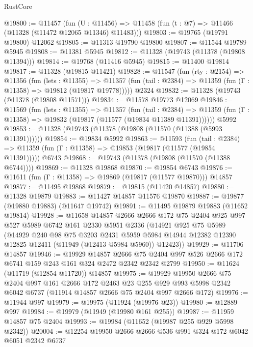 \begin{lexlean}{RustCore}
\begin{coremodule}
@19800 := @11457
    (fun (U : @11456) => @11458 (fun (t : @7) => @11466 (@11328 (@11472 @12065 @11346) @11483)))
@19803 := @19765 (@19791 @19800) @12062
@19805 := @11313 @19790 @19800
@19807 := @11544 @19789 @5945
@19808 := @11381 @5945
@19812 := @11328 (@19743 (@11378 (@19808 @11394)))
@19814 := @19768 (@11416 @5945)
@19815 := @11400 @19814
@19817 := @11328 (@19815 @11421)
@19828 := @11547
    (fun (rty : @2154) =>
    @11356
      (fun (lets : @11355) =>
      @11357 (fun (tail : @2384) => @11359 (fun (Γ : @11358) => @19812 (@19817 @19778)))))
    @2324
@19832 := @11328 (@19743 (@11378 (@19808 @11571)))
@19834 := @11578 @19773 @12069
@19846 := @11569
    (fun (lets : @11355) =>
    @11357
      (fun (tail : @2384) =>
      @11359 (fun (Γ : @11358) => @19832 (@19817 (@11577 (@19834 @11389 @11391))))))
    @5992
@19853 := @11328 (@19743 (@11378 (@19808 (@11570 (@11388 (@5993 @11391))))))
@19854 := @19834 @5992
@19863 := @11593
    (fun (tail : @2384) => @11359 (fun (Γ : @11358) => @19853 (@19817 (@11577 (@19854 @11391)))))
    @6743
@19868 := @19743 (@11378 (@19808 (@11570 (@11388 @6744))))
@19869 := @11328 @19868
@19870 := @19854 @6743
@19876 := @11611 (fun (Γ : @11358) => @19869 (@19817 (@11577 @19870))) @14857
@19877 := @11495 @19868
@19879 := @19815 (@11420 @14857)
@19880 := @11328 @19879
@19883 := @11427 @14857 @11576 @19870
@19887 := @19877 (@19880 @19883) (@11647 @19742)
@19891 := @11495 @19879 @19883 (@11652 @19814)
@19928 := @11658
    @14857
    @2666
    @2666
    @172
    @75
    @2404
    @925
    @997
    @527
    @5989
    @6742
    @161
    @2330
    @5951
    @2336
    (@14921
      @925
      @75
      @5989
      (@14929
        @240
        @98
        @75
        @3203
        @2431
        @5959
        @5984
        @14944
        @12382
        @12390
        @12825
        @12411
        (@11949 (@12413 @5984 @5960))
        @12423))
@19929 := @11706 @14857
@19946 := @19929
    @14857
    @2666
    @75
    @2404
    @997
    @526
    @2666
    @172
    @6741
    @159
    @243
    @161
    @324
    @2472
    @2342
    @2342
    @2799
@19950 := @11624 (@11719 (@12854 @11720)) @14857
@19975 := @19929
    @19950
    @2666
    @75
    @2404
    @997
    @161
    @2666
    @172
    @2463
    @23
    @255
    @929
    @993
    @5998
    @2342
    @6042
    @6737
    (@11914 @14857 @2666 @75 @2404 @997 @2666 @172)
@19976 := @11944 @997
@19979 := @19975 (@11924 (@19976 @23))
@19980 := @12889 @997
@19984 := @19979 (@11949 (@19980 @161 @255))
@19987 := @11959 @14857 @75 @2404
@19993 := @19984 (@11652 (@19987 @255 @929 @5998 @2342))
@20004 := @12254 @19950 @2666 @2666 @536 @991 @324 @172 @6042 @6051 @2342 @6737

\end{coremodule}
\end{lexlean}
